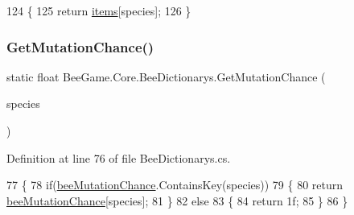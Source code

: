 \begin{DoxyCode}
124         \{
125             \textcolor{keywordflow}{return} \hyperlink{class_bee_game_1_1_core_1_1_bee_dictionarys_a08901f100e7fa17a7a441b32ec680146}{items}[species];
126         \}
\end{DoxyCode}
\mbox{\label{class_bee_game_1_1_core_1_1_bee_dictionarys_adb5fe5760a94dbff606bc1d20ee67aaa}} 
\subsubsection{\texorpdfstring{Get\+Mutation\+Chance()}{GetMutationChance()}\hspace{0.1cm}{\footnotesize\ttfamily [1/2]}}
{\footnotesize\ttfamily static float Bee\+Game.\+Core.\+Bee\+Dictionarys.\+Get\+Mutation\+Chance (\begin{DoxyParamCaption}\item[{\hyperlink{namespace_bee_game_1_1_enums_aa2ead984825678d83c42d48f6382619c}{Bee\+Species}}]{species }\end{DoxyParamCaption})\hspace{0.3cm}{\ttfamily [static]}}



Definition at line 76 of file Bee\+Dictionarys.\+cs.


\begin{DoxyCode}
77         \{
78             \textcolor{keywordflow}{if}(\hyperlink{class_bee_game_1_1_core_1_1_bee_dictionarys_a8928aea7b0d5b04fbf7b5055a9921385}{beeMutationChance}.ContainsKey(species))
79             \{
80                 \textcolor{keywordflow}{return} \hyperlink{class_bee_game_1_1_core_1_1_bee_dictionarys_a8928aea7b0d5b04fbf7b5055a9921385}{beeMutationChance}[species];
81             \}
82             \textcolor{keywordflow}{else}
83             \{
84                 \textcolor{keywordflow}{return} 1f;
85             \}
86         \}
\end{DoxyCode}
\mbox{\label{class_bee_game_1_1_core_1_1_bee_dictionarys_ae563db005a03a49d25cb6cdbd4d3a82e}} 
